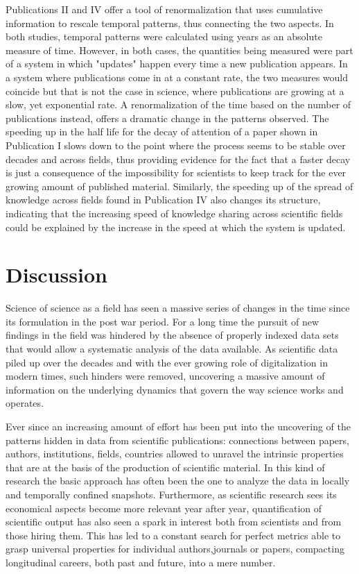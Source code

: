 Publications II and IV offer a tool of renormalization that uses cumulative information to rescale temporal patterns, thus connecting the two aspects. In both studies, temporal patterns
were calculated using years as an absolute measure of time. However, in both cases, the quantities being measured were part of a system in which "updates" happen every time a new publication
appears. In a system where publications come in at a constant rate, the two measures would coincide but that is not the case in science, where publications are growing at a slow,
yet exponential rate. A renormalization of the time based on the number of publications instead, offers a dramatic change in the patterns observed. The speeding up in the 
half life for the decay of attention of a paper shown in Publication I slows down to the point where the process seems to be stable over decades and across fields, thus providing evidence
for the fact that a faster decay is just a consequence of the impossibility for scientists to keep track for the ever growing amount of published material. Similarly,
the speeding up of the spread of knowledge across fields found in Publication IV also changes its structure, indicating that the increasing speed of knowledge sharing across scientific fields
could be explained by the increase in the speed at which the system is updated.


\clearpage
\section{Discussion}
Science of science as a field has seen a massive series of changes in the time since its formulation in the post war period. For a long time the pursuit of new findings in the field
was hindered by the absence of properly indexed data sets that would allow a systematic analysis of the data available. As scientific data piled up over the decades and with
the ever growing role of digitalization in modern times, such hinders were removed, uncovering a massive amount of information on the underlying dynamics that 
govern the way science works and operates.

Ever since an increasing amount of effort has been put into the uncovering of the patterns hidden in data from scientific publications: connections between papers, authors,
institutions, fields, countries allowed to unravel the intrinsic properties that are at the basis of the production of scientific material. In this kind of research the basic
approach has often been the one to analyze the data in locally and temporally confined snapshots. Furthermore, as scientific research sees its economical aspects become more relevant year after year, quantification of scientific output has also seen a spark in interest both from scientists
and from those hiring them. This has led to a constant search for perfect metrics able to grasp universal properties for individual authors,journals or papers, compacting longitudinal careers, both past and future,
into a mere number.

